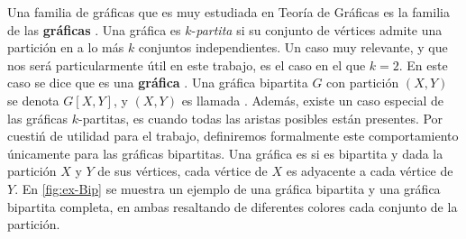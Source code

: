 Una familia de gr\'aficas que es muy estudiada en Teor\'ia de Gr\'aficas es la
familia de las \textbf{gr\'aficas }. Una
gr\'afica es $k$-\textit{partita} si su conjunto de v\'ertices admite una
partici\'on en a lo m\'as $k$ conjuntos independientes. Un caso muy relevante, y
que nos ser\'a particularmente \'util en este trabajo, es el caso en el que
$k=2$. En este caso se dice que es una \textbf{gr\'afica}
. Una gr\'afica
bipartita $G$ con partici\'on $(X,Y)$ se denota $G[X,Y]$, y $(X,Y)$ es llamada
. Adem\'as, existe un caso especial de las gr\'aficas
$k$-partitas, es cuando todas las aristas posibles est\'an presentes. Por
cuesti\'n de utilidad para el trabajo, definiremos formalmente este
comportamiento \'unicamente para las gr\'aficas bipartitas. Una gr\'afica es
 si es
bipartita y dada la partici\'on $X$ y $Y$ de sus v\'ertices, cada v\'ertice de
$X$ es adyacente a cada v\'ertice de $Y$. En \cref{fig:ex-Bip} se muestra un
ejemplo de una gr\'afica bipartita y una gr\'afica bipartita completa, en ambas
resaltando de diferentes colores cada conjunto de la partici\'on. 

